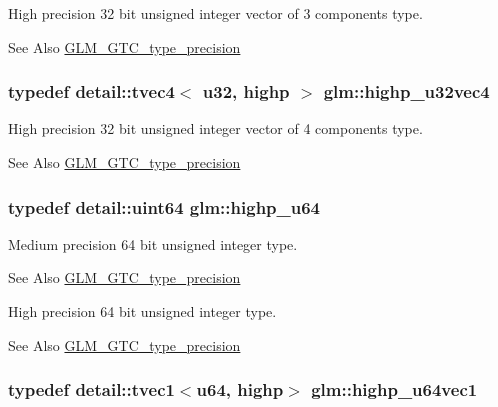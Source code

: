 High precision 32 bit unsigned integer vector of 3 components type. \begin{DoxySeeAlso}{See Also}
\hyperlink{group__gtc__type__precision}{G\-L\-M\-\_\-\-G\-T\-C\-\_\-type\-\_\-precision} 
\end{DoxySeeAlso}
\hypertarget{group__gtc__type__precision_ga9418a8d549d344d4f7b7158771a2fdfe}{
\subsubsection[{highp\-\_\-u32vec4}]{\setlength{\rightskip}{0pt plus 5cm}typedef detail\-::tvec4$<$ u32, highp $>$ {\bf glm\-::highp\-\_\-u32vec4}}}\label{group__gtc__type__precision_ga9418a8d549d344d4f7b7158771a2fdfe}
High precision 32 bit unsigned integer vector of 4 components type. \begin{DoxySeeAlso}{See Also}
\hyperlink{group__gtc__type__precision}{G\-L\-M\-\_\-\-G\-T\-C\-\_\-type\-\_\-precision} 
\end{DoxySeeAlso}
\hypertarget{group__gtc__type__precision_ga6006ea883d3c0491791650b2fb84de39}{
\subsubsection[{highp\-\_\-u64}]{\setlength{\rightskip}{0pt plus 5cm}typedef detail\-::uint64 {\bf glm\-::highp\-\_\-u64}}}\label{group__gtc__type__precision_ga6006ea883d3c0491791650b2fb84de39}
Medium precision 64 bit unsigned integer type. \begin{DoxySeeAlso}{See Also}
\hyperlink{group__gtc__type__precision}{G\-L\-M\-\_\-\-G\-T\-C\-\_\-type\-\_\-precision}
\end{DoxySeeAlso}
High precision 64 bit unsigned integer type. \begin{DoxySeeAlso}{See Also}
\hyperlink{group__gtc__type__precision}{G\-L\-M\-\_\-\-G\-T\-C\-\_\-type\-\_\-precision} 
\end{DoxySeeAlso}
\hypertarget{group__gtc__type__precision_gab48ca217e1d1cc9aac3d9f037493ae7e}{
\subsubsection[{highp\-\_\-u64vec1}]{\setlength{\rightskip}{0pt plus 5cm}typedef detail\-::tvec1$<$u64, highp$>$ {\bf glm\-::highp\-\_\-u64vec1}}}\label{group__gtc__type__precision_gab48ca217e1d1cc9aac3d9f037493ae7e}
